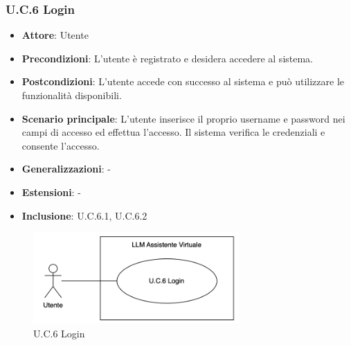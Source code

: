 \subsubsection{U.C.6 Login}
\begin{itemize}
    \item \textbf{Attore}: Utente
    \item \textbf{Precondizioni}: L'utente è registrato e desidera accedere al sistema.
    \item \textbf{Postcondizioni}: L'utente accede con successo al sistema e può utilizzare le funzionalità disponibili.
    \item \textbf{Scenario principale}: L'utente inserisce il proprio username e password nei campi di accesso ed effettua l’accesso. Il sistema verifica le credenziali e consente l'accesso.  
    \item \textbf{Generalizzazioni}: -
    \item \textbf{Estensioni}: -
    \item \textbf{Inclusione}: U.C.6.1, U.C.6.2
\end{itemize}
\begin{figure}[H]
    \centering
    \includegraphics[width=0.7\textwidth]{img/UC6.png}
    \caption{U.C.6 Login}
\end{figure}
\newpage

